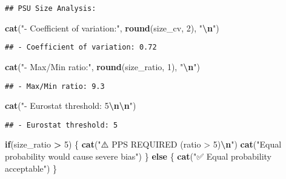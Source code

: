 \documentclass[
]{article}
\newenvironment{Shaded}{\begin{snugshade}}{\end{snugshade}}
\newcommand{\ControlFlowTok}[1]{\textcolor[rgb]{0.13,0.29,0.53}{\textbf{#1}}}
\newcommand{\DecValTok}[1]{\textcolor[rgb]{0.00,0.00,0.81}{#1}}
\newcommand{\FunctionTok}[1]{\textcolor[rgb]{0.13,0.29,0.53}{\textbf{#1}}}
\newcommand{\NormalTok}[1]{#1}
\newcommand{\SpecialCharTok}[1]{\textcolor[rgb]{0.81,0.36,0.00}{\textbf{#1}}}
\newcommand{\StringTok}[1]{\textcolor[rgb]{0.31,0.60,0.02}{#1}}
\begin{document}
\begin{verbatim}
## PSU Size Analysis:
\end{verbatim}

\begin{Shaded}
\begin{Highlighting}[]
\FunctionTok{cat}\NormalTok{(}\StringTok{"{-} Coefficient of variation:"}\NormalTok{, }\FunctionTok{round}\NormalTok{(size\_cv, }\DecValTok{2}\NormalTok{), }\StringTok{"}\SpecialCharTok{\textbackslash{}n}\StringTok{"}\NormalTok{)}
\end{Highlighting}
\end{Shaded}

\begin{verbatim}
## - Coefficient of variation: 0.72
\end{verbatim}

\begin{Shaded}
\begin{Highlighting}[]
\FunctionTok{cat}\NormalTok{(}\StringTok{"{-} Max/Min ratio:"}\NormalTok{, }\FunctionTok{round}\NormalTok{(size\_ratio, }\DecValTok{1}\NormalTok{), }\StringTok{"}\SpecialCharTok{\textbackslash{}n}\StringTok{"}\NormalTok{)}
\end{Highlighting}
\end{Shaded}

\begin{verbatim}
## - Max/Min ratio: 9.3
\end{verbatim}

\begin{Shaded}
\begin{Highlighting}[]
\FunctionTok{cat}\NormalTok{(}\StringTok{"{-} Eurostat threshold: 5}\SpecialCharTok{\textbackslash{}n\textbackslash{}n}\StringTok{"}\NormalTok{)}
\end{Highlighting}
\end{Shaded}

\begin{verbatim}
## - Eurostat threshold: 5
\end{verbatim}

\begin{Shaded}
\begin{Highlighting}[]
\ControlFlowTok{if}\NormalTok{(size\_ratio }\SpecialCharTok{\textgreater{}} \DecValTok{5}\NormalTok{) \{}
  \FunctionTok{cat}\NormalTok{(}\StringTok{"⚠️ PPS REQUIRED (ratio \textgreater{} 5)}\SpecialCharTok{\textbackslash{}n}\StringTok{"}\NormalTok{)}
  \FunctionTok{cat}\NormalTok{(}\StringTok{"Equal probability would cause severe bias"}\NormalTok{)}
\NormalTok{\} }\ControlFlowTok{else}\NormalTok{ \{}
  \FunctionTok{cat}\NormalTok{(}\StringTok{"✅ Equal probability acceptable"}\NormalTok{)}
\NormalTok{\}}
\end{Highlighting}
\end{Shaded}
\end{document}

